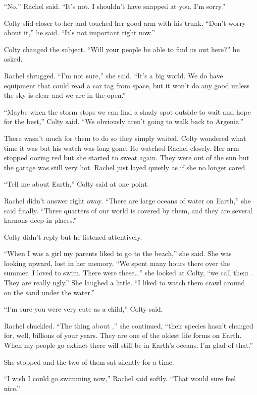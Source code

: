 ``No,'' Rachel said. ``It's not. I shouldn't have snapped at you. I'm sorry.''

Colty slid closer to her and touched her good arm with his trunk. ``Don't worry about it,'' he
said. ``It's not important right now.''

Colty changed the subject. ``Will your people be able to find us out here?'' he asked.

Rachel shrugged. ``I'm not sure,'' she said. ``It's a big world. We do have equipment that could
read a car tag from space, but it won't do any good unless the sky is clear and we are in the
open.''

``Maybe when the storm stops we can find a shady spot outside to wait and hope for the best,''
Colty said. ``We obviously aren't going to walk back to Argenia.''

There wasn't much for them to do so they simply waited. Colty wondered what time it was but his
watch was long gone. He watched Rachel closely. Her arm stopped oozing red but she started to
sweat again. They were out of the sun but the garage was still very hot. Rachel just layed
quietly as if she no longer cared.

``Tell me about Earth,'' Colty said at one point.

Rachel didn't answer right away. ``There are large oceans of water on Earth,'' she said finally.
``Three quarters of our world is covered by them, and they are several karnons deep in places.''

Colty didn't reply but he listened attentively.

``When I was a girl my parents liked to go to the beach,'' she said. She was looking upward,
lost in her memory. ``We spent many hours there over the summer. I loved to swim. There were
these\ldots'' she looked at Colty, ``we call them . They are really
ugly.'' She laughed a little. ``I liked to watch them crawl around on the sand under the
water.''

``I'm sure you were very cute as a child,'' Colty said.

Rachel chuckled. ``The thing about ,'' she continued, ``their species
hasn't changed for, well, billions of your years. They are one of the oldest life forms on
Earth. When my people go extinct there will still be  in Earth's
oceans. I'm glad of that.''

She stopped and the two of them sat silently for a time.

``I wish I could go swimming now,'' Rachel said softly. ``That would sure feel nice.''

